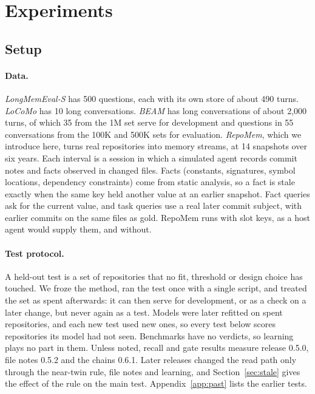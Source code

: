 \section{Experiments}\label{sec:experiments}

\subsection{Setup}\label{sec:setup}
\paragraph{Data.} \emph{LongMemEval-S} \cite{wu2025longmemeval} has 500 questions, each with its own store of about 490 turns. \emph{LoCoMo} \cite{maharana2024locomo} has 10 long conversations. \emph{BEAM} \cite{tavakoli2026beam} has long conversations of about 2,000 turns, of which 35 from the 1M set serve for development and  questions in 55 conversations from the 100K and 500K sets for evaluation. \emph{RepoMem}, which we introduce here, turns real repositories into memory streams, at 14 snapshots over six years. Each interval is a session in which a simulated agent records commit notes and facts observed in changed files. Facts (constants, signatures, symbol locations, dependency constraints) come from static analysis, so a fact is stale exactly when the same key held another value at an earlier snapshot. Fact queries ask for the current value, and task queries use a real later commit subject, with earlier commits on the same files as gold. RepoMem runs with slot keys, as a host agent would supply them, and without.

\paragraph{Test protocol.} A held-out test is a set of repositories that no fit, threshold or design choice has touched. We froze the method, ran the test once with a single script, and treated the set as spent afterwards: it can then serve for development, or as a check on a later change, but never again as a test. Models were later refitted on spent repositories, and each new test used new ones, so every test below scores repositories its model had not seen. Benchmarks have no verdicts, so learning plays no part in them. Unless noted, recall and gate results measure release 0.5.0, file notes 0.5.2 and the chains 0.6.1. Later releases changed the read path only through the near-twin rule, file notes and learning, and Section~\ref{sec:stale} gives the effect of the rule on the main test. Appendix~\ref{app:past} lists the earlier tests.

